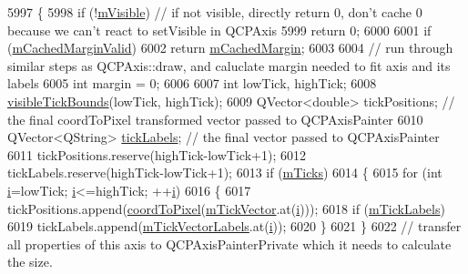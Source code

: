 \begin{DoxyCode}
5997 \{
5998   \textcolor{keywordflow}{if} (!\hyperlink{class_q_c_p_layerable_a62e3aed8427d6ce3ccf716f285106cb3}{mVisible}) \textcolor{comment}{// if not visible, directly return 0, don't cache 0 because we can't react to
       setVisible in QCPAxis}
5999     \textcolor{keywordflow}{return} 0;
6000   
6001   \textcolor{keywordflow}{if} (\hyperlink{class_q_c_p_axis_a2cde37b6e385f47e11322df4ac1b0e9b}{mCachedMarginValid})
6002     \textcolor{keywordflow}{return} \hyperlink{class_q_c_p_axis_a48ace55cbd54f7241e7f1b06fd369b64}{mCachedMargin};
6003   
6004   \textcolor{comment}{// run through similar steps as QCPAxis::draw, and caluclate margin needed to fit axis and its labels}
6005   \textcolor{keywordtype}{int} margin = 0;
6006   
6007   \textcolor{keywordtype}{int} lowTick, highTick;
6008   \hyperlink{class_q_c_p_axis_a06320a944d1120732cc0d72fe1306d8b}{visibleTickBounds}(lowTick, highTick);
6009   QVector<double> tickPositions; \textcolor{comment}{// the final coordToPixel transformed vector passed to QCPAxisPainter}
6010   QVector<QString> \hyperlink{class_q_c_p_axis_a9a78fcccd98a73d37b3d991df7b6ef1d}{tickLabels}; \textcolor{comment}{// the final vector passed to QCPAxisPainter}
6011   tickPositions.reserve(highTick-lowTick+1);
6012   tickLabels.reserve(highTick-lowTick+1);
6013   \textcolor{keywordflow}{if} (\hyperlink{class_q_c_p_axis_ab111e74bba22e06848897c932fc549fe}{mTicks})
6014   \{
6015     \textcolor{keywordflow}{for} (\textcolor{keywordtype}{int} \hyperlink{_comparision_pictures_2_createtest_image_8m_a6f6ccfcf58b31cb6412107d9d5281426}{i}=lowTick; \hyperlink{_comparision_pictures_2_createtest_image_8m_a6f6ccfcf58b31cb6412107d9d5281426}{i}<=highTick; ++\hyperlink{_comparision_pictures_2_createtest_image_8m_a6f6ccfcf58b31cb6412107d9d5281426}{i})
6016     \{
6017       tickPositions.append(\hyperlink{class_q_c_p_axis_a985ae693b842fb0422b4390fe36d299a}{coordToPixel}(\hyperlink{class_q_c_p_axis_aae0f9b9973b85be601200f00f5825087}{mTickVector}.at(\hyperlink{_comparision_pictures_2_createtest_image_8m_a6f6ccfcf58b31cb6412107d9d5281426}{i})));
6018       \textcolor{keywordflow}{if} (\hyperlink{class_q_c_p_axis_a3e4315be072026644e69009557a2fa11}{mTickLabels})
6019         tickLabels.append(\hyperlink{class_q_c_p_axis_aeee4bd0fca3f587eafe33843d1cb4f82}{mTickVectorLabels}.at(\hyperlink{_comparision_pictures_2_createtest_image_8m_a6f6ccfcf58b31cb6412107d9d5281426}{i}));
6020     \}
6021   \}
6022   \textcolor{comment}{// transfer all properties of this axis to QCPAxisPainterPrivate which it needs to calculate the size.}

\end{DoxyCode}
